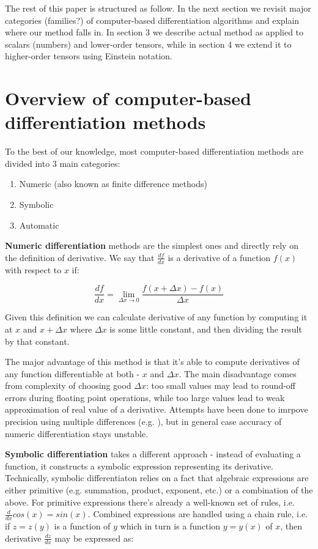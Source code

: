 \documentclass[conference]{IEEEtran}
\begin{document}
The rest of this paper is structured as follow. In the next section we revisit major categories (families?) of computer-based differentiation algorithms and explain where our method falls in. In section 3 we describe actual method as applied to scalars (numbers) and lower-order tensors, while in section 4 we extend it to higher-order tensors using  Einstein notation. 


\section{Overview of computer-based differentiation methods}

To the best of our knowledge, most computer-based differentiation methods are divided into 3 main categories: 

\begin{enumerate}
\item Numeric (also known as finite difference methods)
\item Symbolic
\item Automatic
\end{enumerate}


\textbf{Numeric differentiation} methods are the simplest ones and directly rely on the definition of derivative. We say that $\frac{df}{dx}$ is a derivative of a function $f(x)$ with respect to $x$ if: 

$$\frac{df}{dx} = \lim_{\Delta x \to 0} \frac{f(x + \Delta x) - f(x)}{\Delta x}$$

Given this definition we can calculate derivative of any function by computing it at $x$ and $x + \Delta x$ where $\Delta x$ is some little constant, and then dividing the result by that constant. 

The major advantage of this method is that it's able to compute derivatives of any function differentiable at both - $x$ and $\Delta x$. The main disadvantage comes from complexity of choosing good $\Delta x$: too small values may lead to round-off errors during floating point operations, while too large values lead to weak approximation of real value of a derivative. Attempts have been done to imrpove precision using multiple differences (e.g. \cite{fornberg1988}), but in general case accuracy of numeric differentiation stays unstable. 

\textbf{Symbolic differentiation} takes a different approach - instead of evaluating a function, it constructs a symbolic expression representing its derivative. Technically, symbolic differentiaton relies on a fact that algebraic expressions are either primitive (e.g. summation, product, exponent, etc.) or a combination of the above. For primitive expressions there's already a well-known set of rules, i.e. $\frac{d}{dx}cos(x) = sin(x)$. Combined expressions are handled using a chain rule, i.e. if $z = z(y)$ is a function of $y$ which in turn is a function $y = y(x)$ of $x$, then derivative $\frac{dz}{dx}$ may be expressed as:
\end{document}
